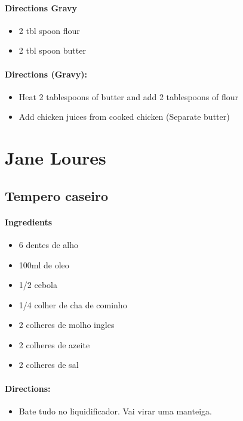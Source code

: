 \documentclass{article}
\begin{document}
\paragraph{Directions Gravy}
\begin{itemize}
	\item 2 tbl spoon flour
	\item 2 tbl spoon butter
\end{itemize}

\paragraph{Directions (Gravy):}
\begin{itemize}
	\item Heat 2 tablespoons of butter and add 2 tablespoons of flour
	\item Add chicken juices from cooked chicken (Separate butter)
\end{itemize}

\section{Jane Loures}

\subsection{Tempero caseiro}

\paragraph{Ingredients}
\begin{itemize}
	\item 6 dentes de alho
	\item 100ml de oleo
	\item 1/2 cebola
	\item 1/4 colher de cha de cominho
	\item 2 colheres de molho ingles
	\item 2 colheres de azeite
	\item 2 colheres de sal
\end{itemize}

\paragraph{Directions:}
\begin{itemize}
	\item Bate tudo no liquidificador. Vai virar uma manteiga.
\end{itemize}
\end{document}
